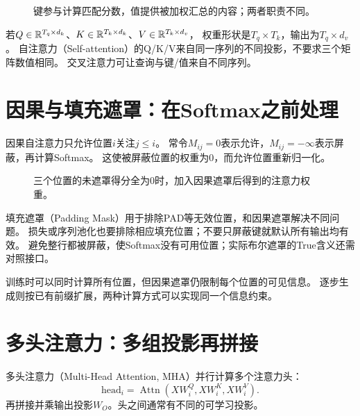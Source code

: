 \begin{figure}[htbp]
\centering
\caption{键参与计算匹配分数，值提供被加权汇总的内容；两者职责不同。}
\par\smallskip
{}
\end{figure}

若$Q\in\mathbb{R}^{T_q\times d_k}$、$K\in\mathbb{R}^{T_k\times d_k}$、$V\in\mathbb{R}^{T_k\times d_v}$，
权重形状是$T_q\times T_k$，输出为$T_q\times d_v$。
自注意力（Self-attention）的Q/K/V来自同一序列的不同投影，不要求三个矩阵数值相同。
交叉注意力可让查询与键/值来自不同序列。


\section{因果与填充遮罩：在Softmax之前处理}
\label{sec:seq-mask}
因果自注意力只允许位置$i$关注$j\leq i$。
常令$M_{ij}=0$表示允许，$M_{ij}=-\infty$表示屏蔽，再计算Softmax。
这使被屏蔽位置的权重为0，而允许位置重新归一化。

\begin{figure}[htbp]
\centering
\caption{三个位置的未遮罩得分全为0时，加入因果遮罩后得到的注意力权重。}
\par\smallskip
{}
\end{figure}

填充遮罩（Padding Mask）用于排除PAD等无效位置，和因果遮罩解决不同问题。
损失或序列池化也要排除相应填充位置；不要只屏蔽键就默认所有输出均有效。
避免整行都被屏蔽，使Softmax没有可用位置；实际布尔遮罩的True含义还需对照接口。

\begin{keyidea}[并行计算与因果约束]
训练时可以同时计算所有位置，但因果遮罩仍限制每个位置的可见信息。
逐步生成则按已有前缀扩展，两种计算方式可以实现同一个信息约束。
\end{keyidea}

\section{多头注意力：多组投影再拼接}
\label{sec:seq-heads}
多头注意力（Multi-Head Attention, MHA）并行计算多个注意力头：
\[\mathrm{head}_i=\operatorname{Attn}(XW_i^Q,XW_i^K,XW_i^V).\]
再拼接并乘输出投影$W_O$。头之间通常有不同的可学习投影。

